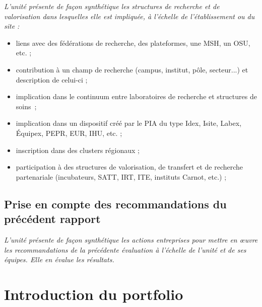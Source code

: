 \documentclass[]{article}
\newcommand{\instructions}[1]{{\em \color{hceresgreen}#1}}
\begin{document}
\instructions{L’unité présente de façon synthétique les structures de recherche et de valorisation dans lesquelles elle est impliquée, à l’échelle de l’établissement ou du site :
\begin{itemize}
\item liens avec des fédérations de recherche, des plateformes, une MSH, un OSU, etc. ;
\item contribution à un champ de recherche (campus, institut, pôle, secteur...) et description de celui-ci ;
\item implication dans le continuum entre laboratoires de recherche et structures de soins ; 
\item implication dans un dispositif créé par le PIA du type Idex, Isite, Labex, Équipex, PEPR, EUR, IHU, etc. ;
\item inscription dans des clusters régionaux ;
\item participation à des structures de valorisation, de transfert et de recherche partenariale (incubateurs, SATT, IRT, ITE, instituts Carnot, etc.) ;
\end{itemize}
}

\subsection{Prise en compte des recommandations du précédent rapport}

\instructions{L’unité présente de façon synthétique les actions entreprises pour mettre en œuvre les recommandations de la précédente évaluation à l’échelle de l’unité et de ses équipes. Elle en évalue les résultats.}

\section{Introduction du portfolio}
\end{document}
